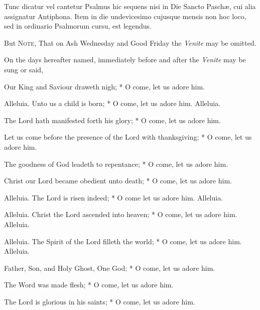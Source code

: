 \begin{rubric}
    Tunc dicatur vel cantetur Psalmus hic sequens nisi in Die Sancto Paschæ, cui alia assignatur Antiphona. Item in die undevicesimo cujusque mensis non hoc loco, sed in ordinario Psalmorum cursu, est legendus.
\end{rubric}
\begin{rubric}
    But \textsc{Note}, That on Ash Wednesday and Good Friday the \emph{Venite} may be omitted.
\end{rubric}
\begin{rubric}
    On the days hereafter named, immediately before and after the \emph{Venite} may be sung or said,
\end{rubric}
\par\noindent
{} Our King and Saviour draweth nigh; * O come, let us adore him.
\par\noindent
{} Alleluia. Unto us a child is born; * O come, let us adore him. Alleluia.
\par\noindent
{} The Lord hath manifested forth his glory; * O come, let us adore him.
\par\noindent
 Let us come before the presence of the Lord with thanksgiving;  * O come, let us adore him.
\par\noindent
 The goodness of God leadeth to repentance; * O come, let us adore him.
\par\noindent
{} Christ our Lord became obedient unto death; * O come, let us adore him.
\par\noindent
{} Alleluia. The Lord is risen indeed; * O come let us adore him. Alleluia.
\par\noindent
{} Alleluia. Christ the Lord ascended into heaven; * O come, let us adore him. Alleluia.
\par\noindent
{} Alleluia. The Spirit of the Lord filleth the world; * O come, let us adore him. Alleluia.
\par\noindent
{} Father, Son, and Holy Ghost, One God; * O come, let us adore him.
\par\noindent
{} The Word was made flesh; * O come, let us adore him.
\par\noindent
 The Lord is glorious in his saints; * O come, let us adore him.

